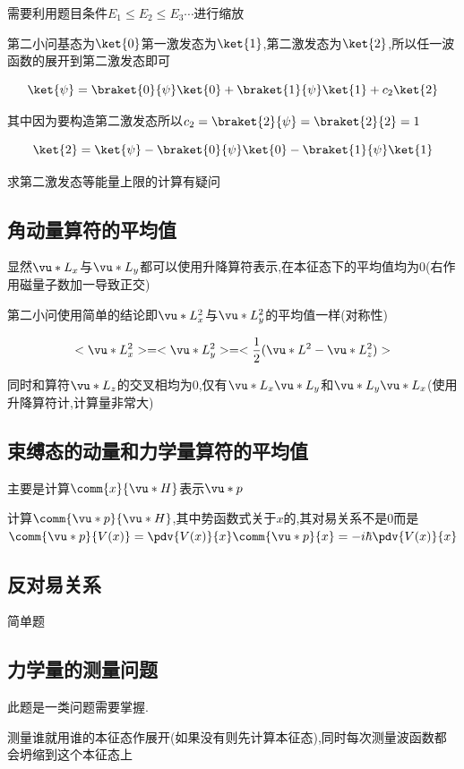             需要利用题目条件$ E_{1} \leq E_{2} \leq E_{3} \cdots $进行缩放

            第二小问基态为$\ket{0}$第一激发态为$\ket{1}$,第二激发态为$\ket{2}$,所以任一波函数的展开到第二激发态即可

            $$ \ket{\psi} = \braket{0}{\psi} \ket{0} + \braket{1}{\psi} \ket{1} + c_{2} \ket{2} $$

            其中因为要构造第二激发态所以$c_{2} = \braket{2}{\psi} = \braket{2}{2} = 1$

            $$   \ket{2} = \ket{\psi} - \braket{0}{\psi} \ket{0} - \braket{1}{\psi} \ket{1} $$
            
            求第二激发态等能量上限的计算有疑问
        
        \subsection{角动量算符的平均值}
            显然$\vu*{L}_{x}$与$\vu*{L}_{y}$都可以使用升降算符表示,在本征态下的平均值均为0(右作用磁量子数加一导致正交)

            第二小问使用简单的结论即$\vu*{L}_{x}^{2}$与$\vu*{L}_{y}^{2}$的平均值一样(对称性)

            $$ <\vu*{L}_{x}^{2}>  = <\vu*{L}_{y}^{2}> = < \frac{1}{2} (\vu*{L}^{2} - \vu*{L}_{z}^{2}) > $$

            同时和算符$\vu*{L}_{z}$的交叉相均为0,仅有$\vu*{L}_{x} \vu*{L}_{y}$和$\vu*{L}_{y} \vu*{L}_{x}$(使用升降算符计,计算量非常大)

        \subsection{束缚态的动量和力学量算符的平均值}
            主要是计算$\comm{x}{\vu*{H}}$表示$\vu*{p}$

            计算$\comm{\vu*{p}}{\vu*{H}}$,其中势函数式关于$x$的,其对易关系不是0而是$\comm{\vu*{p}}{V(x)} = \pdv{V(x)}{x} \comm{\vu*{p}}{x} = -i\hbar \pdv{V(x)}{x}$

        \subsection{反对易关系}
            简单题
        \subsection{力学量的测量问题}
            此题是一类问题需要掌握.
            \begin{formal}
                测量谁就用谁的本征态作展开(如果没有则先计算本征态),同时每次测量波函数都会坍缩到这个本征态上
            \end{formal}

